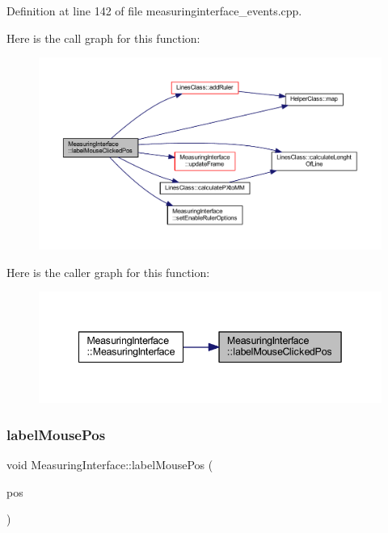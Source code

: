 Definition at line 142 of file measuringinterface\+\_\+events.\+cpp.

Here is the call graph for this function\+:
\nopagebreak
\begin{figure}[H]
\begin{center}
\leavevmode
\includegraphics[width=350pt]{classMeasuringInterface_a02eaf8106ec4eb62d0057c6d447f94c5_cgraph}
\end{center}
\end{figure}
Here is the caller graph for this function\+:
\nopagebreak
\begin{figure}[H]
\begin{center}
\leavevmode
\includegraphics[width=342pt]{classMeasuringInterface_a02eaf8106ec4eb62d0057c6d447f94c5_icgraph}
\end{center}
\end{figure}
\mbox{\label{classMeasuringInterface_a3e7eef22037ecb47ad2349205684c6ea}} 
\subsubsection{\texorpdfstring{labelMousePos}{labelMousePos}}
{\footnotesize\ttfamily void Measuring\+Interface\+::label\+Mouse\+Pos (\begin{DoxyParamCaption}\item[{Q\+Point \&}]{pos }\end{DoxyParamCaption})\hspace{0.3cm}{\ttfamily [slot]}}



